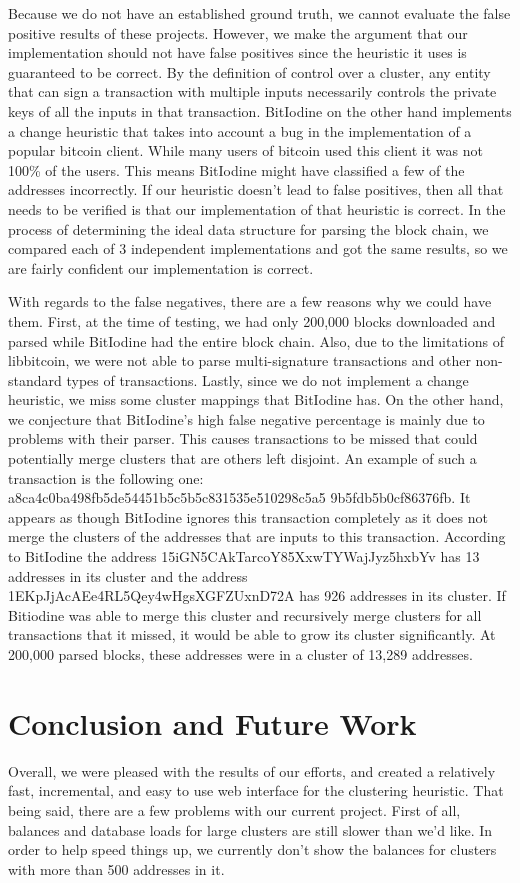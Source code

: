 \documentclass[10pt, letterpaper, twocolumn, twoside]{article}
\begin{document}
Because we do not have an established ground truth, we cannot evaluate the false positive results of these projects. However, we make the argument that our implementation should not have false positives since the heuristic it uses is guaranteed to be correct. By the definition of control over a cluster, any entity that can sign a transaction with multiple inputs necessarily controls the private keys of all the inputs in that transaction. BitIodine on the other hand implements a change heuristic that takes into account a bug in the implementation of a popular bitcoin client. While many users of bitcoin used this client it was not 100\% of the users. This means BitIodine might have classified a few of the addresses incorrectly. If our heuristic doesn't lead to false positives, then all that needs to be verified is that our implementation of that heuristic is correct. In the process of determining the ideal data structure for parsing the block chain, we compared each of 3 independent implementations and got the same results, so we are fairly confident our implementation is correct.

With regards to the false negatives, there are a few reasons why we could have them. First, at the time of testing, we had only 200,000 blocks downloaded and parsed while BitIodine had the entire block chain. Also, due to the limitations of libbitcoin, we were not able to parse multi-signature transactions and other non-standard types of transactions. Lastly, since we do not implement a change heuristic, we miss some cluster mappings that BitIodine has. On the other hand, we conjecture that BitIodine's high false negative percentage is mainly due to problems with their parser. This causes transactions to be missed that could potentially merge clusters that are others left disjoint. An example of such a transaction is the following one: a8ca4c0ba498fb5de54451b5c5b5c831535e510298c5a5
9b5fdb5b0cf86376fb. It appears as though BitIodine ignores this transaction completely as it does not merge the clusters of the addresses that are inputs to this transaction. According to BitIodine the address 15iGN5CAkTarcoY85XxwTYWajJyz5hxbYv has 13 addresses in its cluster and the address 1EKpJjAcAEe4RL5Qey4wHgsXGFZUxnD72A has 926 addresses in its cluster. If Bitiodine was able to merge this cluster and recursively merge clusters for all transactions that it missed, it would be able to grow its cluster significantly. At 200,000 parsed blocks, these addresses were in a cluster of 13,289 addresses.

\section{Conclusion and Future Work}
Overall, we were pleased with the results of our efforts, and created a relatively fast, incremental, and easy to use web interface for the clustering heuristic. That being said, there are a few problems with our current project. First of all, balances and database loads for large clusters are still slower than we'd like. In order to help speed things up, we currently don't show the balances for clusters with more than 500 addresses in it. 
\end{document}
